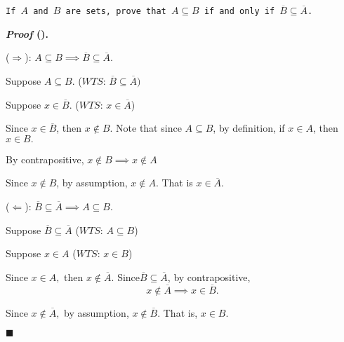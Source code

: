 \documentclass[12pt,a4paper]{article}
\newcounter{nprf}[subsection]
\newenvironment*{prf}{\par\indent\textbf{\textit{Proof} (\stepcounter{nprf}\thenprf). }\par}{\par\hfill $\blacksquare$\par}
\def\WTS{\mathit{WTS}}
\begin{document}
\begin{framed}
\noindent\texttt{If $A$ and $B$ are sets, prove that $A\subseteq B$ if and only if $\overline{B}\subseteq\overline{A}$.}
\begin{prf}
	($\Rightarrow$): $A\subseteq B\implies\overline{B}\subseteq\overline{A}.$\par Suppose $A\subseteq B.$ ($\WTS$: $\overline{B}\subseteq\overline{A})$\par Suppose $x\in\overline{B}.$ ($\WTS$: $x\in\overline{A}$)\par Since $x\in\overline{B}$, then $x\notin B$. Note that since $A\subseteq B$, by definition, if $x\in A$, then $x\in B.$\par By contrapositive, $x\notin B\implies x\notin A$\par Since $x\notin B$, by assumption, $x\notin A$. That is $x\in\overline{A}.$\par ($\Leftarrow$): $\overline{B}\subseteq\overline{A}\implies A\subseteq B.$\par Suppose $\overline{B}\subseteq\overline{A}$ ($\WTS$: $A\subseteq B$)\par Suppose $x\in A$ ($\WTS$: $x\in B$)\par Since $x\in A,$ then $x\notin\overline{A}.$ Since$\overline{B}\subseteq\overline{A}$, by contrapositive, \[x\notin\overline{A}\implies x\in\overline{B}.\]\par Since $x\notin\overline{A},$ by assumption, $x\notin\overline{B}$. That is, $x\in B$.
\end{prf}	
\end{framed}
\end{document}
